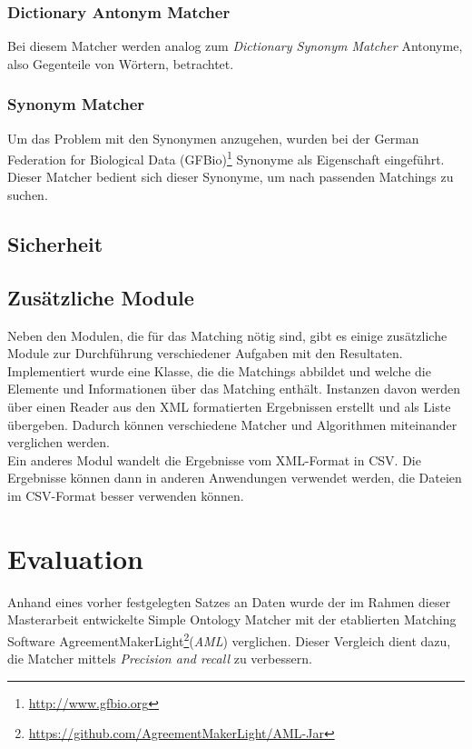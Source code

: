 		\subsubsection{Dictionary Antonym Matcher}
		Bei diesem Matcher werden analog zum \textit{Dictionary Synonym Matcher}
		Antonyme, also Gegenteile von Wörtern, betrachtet.
		
		\subsubsection{Synonym Matcher}
		Um das Problem mit den Synonymen anzugehen, wurden bei der German Federation
		for Biological Data (GFBio)\footnote{\url{http://www.gfbio.org}} Synonyme als
		Eigenschaft eingeführt. Dieser Matcher bedient sich dieser Synonyme, um nach passenden
		Matchings zu suchen.
		
		\subsection{Sicherheit}
		
		\subsection{Zusätzliche Module}
		Neben den Modulen, die für das Matching nötig sind, gibt es einige zusätzliche
		Module zur Durchführung verschiedener Aufgaben mit den Resultaten.\\
		Implementiert wurde eine Klasse, die die Matchings abbildet und welche die
		Elemente und Informationen über das Matching enthält. Instanzen davon werden
		über einen Reader aus den XML formatierten Ergebnissen erstellt und als Liste
		übergeben. Dadurch können verschiedene Matcher und Algorithmen miteinander
		verglichen werden.\\
		Ein anderes Modul wandelt die Ergebnisse vom XML-Format in CSV. Die Ergebnisse
		können dann in anderen Anwendungen verwendet werden, die Dateien im CSV-Format
		besser verwenden können.
		
		\section{Evaluation}
		Anhand eines vorher festgelegten Satzes an Daten wurde der im Rahmen dieser
		Masterarbeit entwickelte Simple Ontology Matcher mit der etablierten Matching
		Software
		AgreementMakerLight\footnote{\url{https://github.com/AgreementMakerLight/AML-Jar}}(\textit{AML})
		verglichen. Dieser Vergleich dient dazu, die Matcher mittels \textit{Precision
		and recall} zu verbessern.
		
